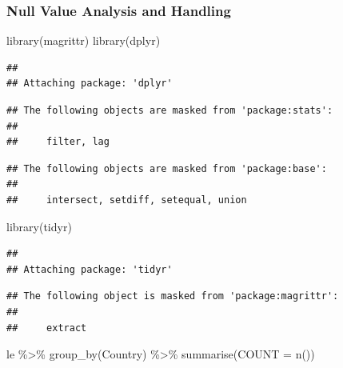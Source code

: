 \documentclass[
]{article}
\newenvironment{Shaded}{\begin{snugshade}}{\end{snugshade}}
\newcommand{\AttributeTok}[1]{\textcolor[rgb]{0.77,0.63,0.00}{#1}}
\newcommand{\FunctionTok}[1]{\textcolor[rgb]{0.00,0.00,0.00}{#1}}
\newcommand{\NormalTok}[1]{#1}
\newcommand{\SpecialCharTok}[1]{\textcolor[rgb]{0.00,0.00,0.00}{#1}}
\begin{document}
\hypertarget{null-value-analysis-and-handling}{%
\subsubsection{Null Value Analysis and
Handling}\label{null-value-analysis-and-handling}}

\begin{Shaded}
\begin{Highlighting}[]
\FunctionTok{library}\NormalTok{(magrittr) }
\FunctionTok{library}\NormalTok{(dplyr)  }
\end{Highlighting}
\end{Shaded}

\begin{verbatim}
## 
## Attaching package: 'dplyr'
\end{verbatim}

\begin{verbatim}
## The following objects are masked from 'package:stats':
## 
##     filter, lag
\end{verbatim}

\begin{verbatim}
## The following objects are masked from 'package:base':
## 
##     intersect, setdiff, setequal, union
\end{verbatim}

\begin{Shaded}
\begin{Highlighting}[]
\FunctionTok{library}\NormalTok{(tidyr)}
\end{Highlighting}
\end{Shaded}

\begin{verbatim}
## 
## Attaching package: 'tidyr'
\end{verbatim}

\begin{verbatim}
## The following object is masked from 'package:magrittr':
## 
##     extract
\end{verbatim}

\begin{Shaded}
\begin{Highlighting}[]
\NormalTok{le }\SpecialCharTok{\%\textgreater{}\%} \FunctionTok{group\_by}\NormalTok{(Country) }\SpecialCharTok{\%\textgreater{}\%} \FunctionTok{summarise}\NormalTok{(}\AttributeTok{COUNT =} \FunctionTok{n}\NormalTok{())}
\end{Highlighting}
\end{Shaded}
\end{document}
